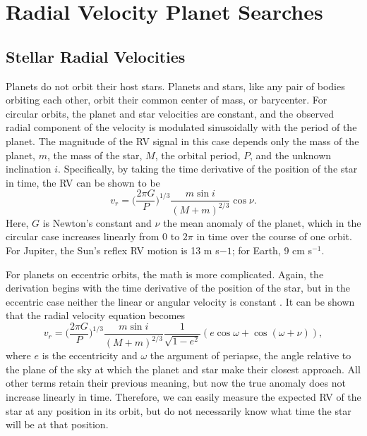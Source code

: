 \section{Radial Velocity Planet Searches}
\subsection{Stellar Radial Velocities}
Planets do not orbit their host stars.
Planets and stars, like any pair of bodies orbiting each other, orbit their common
center of mass, or barycenter.
For circular orbits, the planet and star velocities are constant, and the observed
radial component of the velocity is modulated sinusoidally with the period of the planet.
The magnitude of the RV signal in this case depends only the mass of the planet, $m$, 
the mass of the star, $M$, the orbital period, $P$, and the unknown inclination $i$.
Specifically, by taking the time derivative of the position of the star in time,
the RV can be shown to be
\begin{equation}
v_r = \bigg(\frac{2\pi G}{P}\bigg)^{1/3} \frac{m \sin i}{(M+m)^{2/3}} \cos{\nu}.
\end{equation}
Here, $G$ is Newton's constant and $\nu$ the mean anomaly of the planet, which in the circular case increases
linearly from $0$ to $2\pi$ in time over the course of one orbit.
For Jupiter, the Sun's reflex RV motion is 13 m s${-1}$; for Earth, 9 cm s$^{-1}$.

For planets on eccentric orbits, the math is more complicated.
Again, the derivation begins with the time derivative of the position of the star, but
in the eccentric case neither the linear or angular velocity is constant \citep{Kepler09}.
It can be shown that the radial velocity equation becomes
\begin{equation}
v_r = \bigg(\frac{2\pi G}{P}\bigg)^{1/3} \frac{m \sin i}{(M+m)^{2/3}} \frac{1}{\sqrt{1-e^2}}
(e \cos \omega + \cos(\omega + \nu)),
\label{eq:rv}
\end{equation}
where $e$ is the eccentricity and $\omega$ the argument of periapse, the angle relative
to the plane of the sky at which the planet and star make their closest approach.
All other terms retain their previous meaning, but now the true anomaly does not 
increase linearly in time.
Therefore, we can easily measure the expected RV of the star at any position in its 
orbit, but do not necessarily know what time the star will be at that position.

